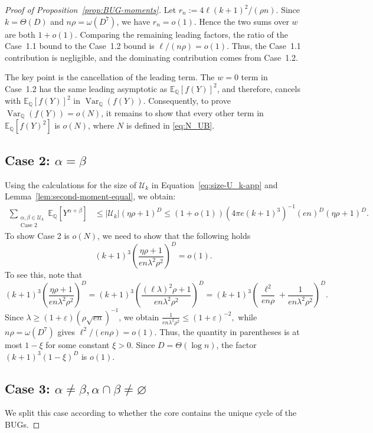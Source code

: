 \documentclass[11pt, letterpaper]{article}
\numberwithin{equation}{section}
\newcommand{\E}{\mathbb{E}}
\newcommand{\QQ}{\mathbb{Q}}
\newcommand{\cU}{\mathcal{U}}
\begin{document}
\begin{proof}[Proof of Proposition~\ref{prop:BUG-moments}]
\noindent Let $r_n:=4\ell(k+1)^2/(\rho n)$. Since $k=\Theta(D)$ and $n\rho=\omega(D^7)$, we have $r_n=o(1)$. Hence the two sums over $w$ are both $1+o(1)$. Comparing the remaining leading factors, the ratio of the Case~1.1 bound to the Case~1.2 bound is $\ell/(n\rho)=o(1).$ Thus, the Case~1.1 contribution is negligible, and the dominating contribution comes from Case~1.2. 

The key point is the cancellation of the leading term. The $w=0$ term in
Case~1.2 has the same leading asymptotic as $\E_\QQ[f(Y)]^2$, and therefore,
cancels with $\E_\QQ[f(Y)]^2$ in $\operatorname{Var}_\QQ(f(Y))$. Consequently,
to prove $\operatorname{Var}_\QQ(f(Y))=o(N)$, it remains to show that every
other term in $\E_\QQ[f(Y)^2]$ is $o(N)$, where $N$ is defined in
\eqref{eq:N_UB}.
\subsection*{Case 2: $\alpha=\beta$}
Using the calculations for the size of $\cU_k$ in Equation~\eqref{eq:size-U_k-app} and Lemma~\ref{lem:second-moment-equal}, we obtain:
\begin{align*}
    \sum_{\substack{\alpha,\beta \in \cU_k \\ \text{Case 2}}}\E_\QQ[Y^{\alpha+\beta}]&\leq |\cU_k|(\eta\rho+1)^D\leq(1+o(1)) (4\pi e (k+1)^3)^{-1} (en)^D (\eta\rho+1)^D.
\end{align*}
To show Case 2 is $o(N)$, we need to show that the following holds
\begin{equation*}
(k+1)^{3}\left(\frac{\eta\rho+1}{en\lambda^2\rho^2}\right)^D= o(1).\end{equation*}
To see this, note that
\begin{equation*}
   (k+1)^{3}\left(\frac{\eta\rho+1}{en\lambda^2\rho^2}\right)^D= (k+1)^{3}\left(\frac{(\ell\lambda)^2\rho+1}{en\lambda^2\rho^2}\right)^D=(k+1)^{3}\left({\frac{\ell^2}{en\rho}}+\frac{1}{en\lambda^2\rho^2}\right)^D.
\end{equation*}
Since $\lambda\ge (1+\varepsilon)(\rho\sqrt{en})^{-1}$,
we obtain 
$\frac{1}{en\lambda^2\rho^2}\le (1+\varepsilon)^{-2},$
while $n\rho=\omega(D^7)$ gives $\ell^2/(en\rho)=o(1)$. Thus, the
quantity in parentheses is at most $1-\xi$ for some constant
$\xi>0$. Since $D=\Theta(\log n)$, the factor
$(k+1)^3(1-\xi)^D$ is $o(1)$.
\subsection*{Case 3: $\alpha \neq \beta, \alpha \cap \beta \neq \varnothing$}We split this case according to whether the core contains the unique cycle of the BUGs.



\end{proof}
\end{document}
